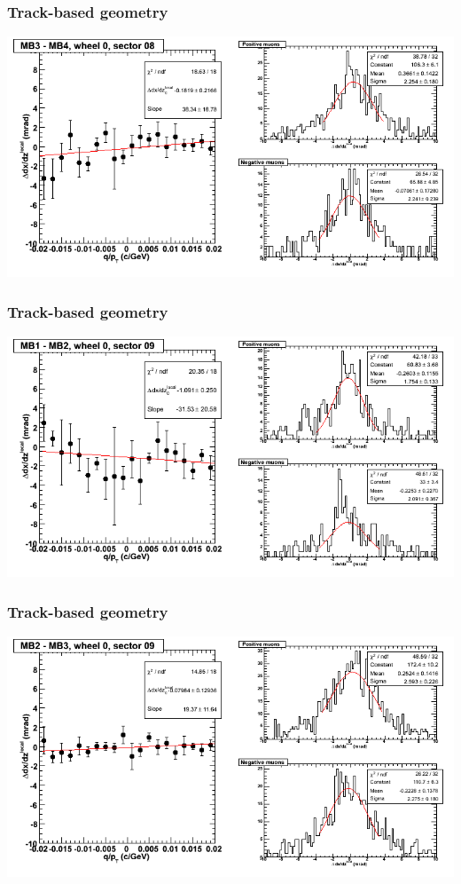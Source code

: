 \documentclass[compress]{beamer}
\begin{document}
\begin{frame}
\frametitle{Track-based geometry}
\includegraphics[width=\linewidth]{NOV4_segdiffs/dt13_slope_C_08_34.png}
\end{frame}

\begin{frame}
\frametitle{Track-based geometry}
\includegraphics[width=\linewidth]{NOV4_segdiffs/dt13_slope_C_09_12.png}
\end{frame}

\begin{frame}
\frametitle{Track-based geometry}
\includegraphics[width=\linewidth]{NOV4_segdiffs/dt13_slope_C_09_23.png}
\end{frame}
\end{document}
